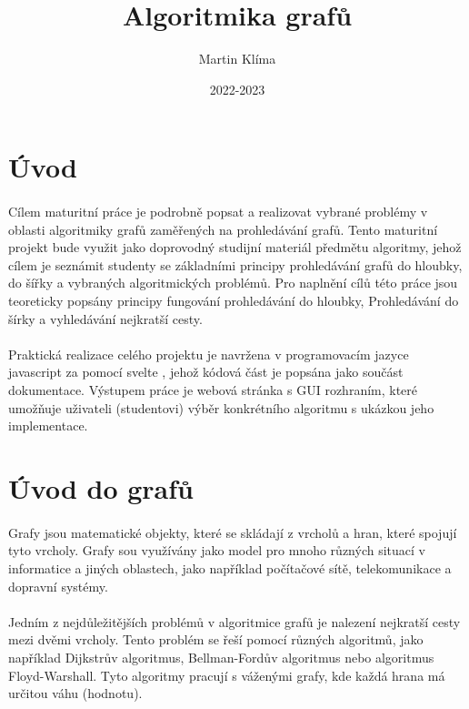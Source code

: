 \documentclass[12pt]{article}
\title{Algoritmika grafů}
\author{Martin Klíma}
\date{2022-2023}
\begin{document}
\maketitle
\newpage

\tableofcontents
\newpage

\section{Úvod}
\paragraph{}
Cílem maturitní práce je podrobně popsat a realizovat vybrané problémy v oblasti 
algoritmiky grafů zaměřených na prohledávání grafů.
Tento maturitní projekt bude využit jako doprovodný studijní materiál předmětu 
algoritmy, jehož cílem je seznámit studenty se základními principy 
prohledávání grafů do hloubky, do šířky a vybraných algoritmických problémů. 
Pro naplnění cílů této práce jsou teoreticky popsány principy fungování prohledávání do hloubky,
Prohledávání do šírky a vyhledávání nejkratší cesty.
\paragraph{}
Praktická realizace celého projektu je navržena v programovacím jazyce javascript za pomocí svelte
, jehož kódová část je popsána jako součást dokumentace. Výstupem práce je webová stránka 
s GUI rozhraním, které umožňuje uživateli (studentovi) výběr konkrétního algoritmu s ukázkou jeho implementace.

\section{Úvod do grafů}
\paragraph{}
Grafy jsou matematické objekty, které se skládají z vrcholů a hran, které spojují tyto 
vrcholy. Grafy sou využívány jako model pro mnoho různých situací v informatice a jiných 
oblastech, jako například počítačové sítě, telekomunikace a dopravní systémy.
\paragraph{}
Jedním z nejdůležitějších problémů v algoritmice grafů je nalezení nejkratší cesty mezi 
dvěmi vrcholy. Tento problém se řeší pomocí různých algoritmů, jako například Dijkstrův 
algoritmus, Bellman-Fordův algoritmus nebo algoritmus Floyd-Warshall. Tyto algoritmy 
pracují s váženými grafy, kde každá hrana má určitou váhu (hodnotu).
\end{document}
